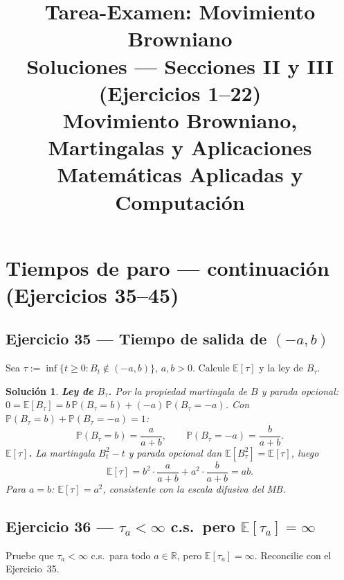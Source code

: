 \documentclass[12pt,letterpaper]{article}
\title{%
  \textbf{Tarea-Examen: Movimiento Browniano}\\[4pt]
  \large Soluciones — Secciones II y III (Ejercicios 1–22)\\
  \normalsize Movimiento Browniano, Martingalas y Aplicaciones\\
  Matemáticas Aplicadas y Computación
}
\author{}
\date{}
\theoremstyle{ejercicio}
\theoremstyle{solucion}
\newtheorem*{solucion}{Solución}
\newcommand{\E}{\mathbb{E}}
\newcommand{\R}{\mathbb{R}}
\renewcommand{\P}{\mathbb{P}}
\begin{document}
\maketitle





\section{Tiempos de paro — continuación (Ejercicios 35--45)}

\subsection*{Ejercicio 35 — Tiempo de salida de $(-a,b)$}

\begin{recuadro}
Sea $\tau:=\inf\{t\ge 0:B_t\notin(-a,b)\}$, $a,b>0$. Calcule $\E[\tau]$ y la ley de $B_\tau$.
\end{recuadro}

\begin{solucion}
\textbf{Ley de $B_\tau$.} Por la propiedad martingala de $B$ y parada opcional:
$0=\E[B_\tau]=b\,\P(B_\tau=b)+(-a)\,\P(B_\tau=-a)$.
Con $\P(B_\tau=b)+\P(B_\tau=-a)=1$:
\[
  \P(B_\tau=b)=\frac{a}{a+b},\qquad \P(B_\tau=-a)=\frac{b}{a+b}.
\]
\textbf{$\E[\tau]$.} La martingala $B_t^2-t$ y parada opcional dan $\E[B_\tau^2]=\E[\tau]$, luego
\[
  \E[\tau]=b^2\cdot\frac{a}{a+b}+a^2\cdot\frac{b}{a+b}=ab.
\]
Para $a=b$: $\E[\tau]=a^2$, consistente con la escala difusiva del MB.
\end{solucion}

\subsection*{Ejercicio 36 — $\tau_a<\infty$ c.s.\ pero $\E[\tau_a]=\infty$}

\begin{recuadro}
Pruebe que $\tau_a<\infty$ c.s.\ para todo $a\in\R$, pero $\E[\tau_a]=\infty$.
Reconcilie con el Ejercicio~35.
\end{recuadro}
\end{document}
